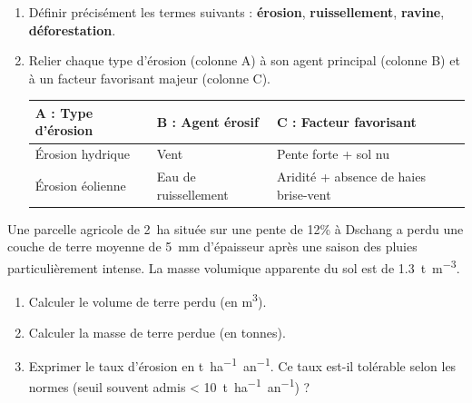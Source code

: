 \documentclass[11pt]{article}
\newcounter{popsec}
\newcounter{popsub}
\newcommand{\courssub}[1]{%
  \stepcounter{popsub}%
  \par\vspace{9pt}\noindent{\popxbold\fontsize{11.5}{13}\selectfont\color{popink}{\color{poporange}\thepopsec.\thepopsub}\hspace{6pt}#1}\par\nopagebreak\vspace{4pt}
}
\begin{document}
\begin{exercice}
\begin{enumerate}
    \item Définir précisément les termes suivants : \textbf{érosion}, \textbf{ruissellement}, \textbf{ravine}, \textbf{déforestation}.
    \item Relier chaque type d'érosion (colonne A) à son agent principal (colonne B) et à un facteur favorisant majeur (colonne C).
    \begin{center}
    \begin{tabularx}{\linewidth}{|X|X|X|}\hline
    \textbf{A : Type d'érosion} & \textbf{B : Agent érosif} & \textbf{C : Facteur favorisant} \\ \hline
    Érosion hydrique & Vent & Pente forte + sol nu \\ \hline
    Érosion éolienne & Eau de ruissellement & Aridité + absence de haies brise-vent \\ \hline
    \end{tabularx}
    \end{center}
\end{enumerate}
\end{exercice}

\begin{exercice}
Une parcelle agricole de \SI{2}{\hectare} située sur une pente de 12\% à Dschang a perdu une couche de terre moyenne de \SI{5}{\milli\metre} d'épaisseur après une saison des pluies particulièrement intense. La masse volumique apparente du sol est de \SI{1,3}{\tonne\per\cubic\metre}.
\begin{enumerate}
    \item Calculer le volume de terre perdu (en \si{\cubic\metre}).
    \item Calculer la masse de terre perdue (en tonnes).
    \item Exprimer le taux d'érosion en \si{t.ha^{-1}.an^{-1}}. Ce taux est-il tolérable selon les normes (seuil souvent admis < \SI{10}{t.ha^{-1}.an^{-1}}) ?
\end{enumerate}
\end{exercice}

\courssub{Je m'entraîne}
\end{document}
